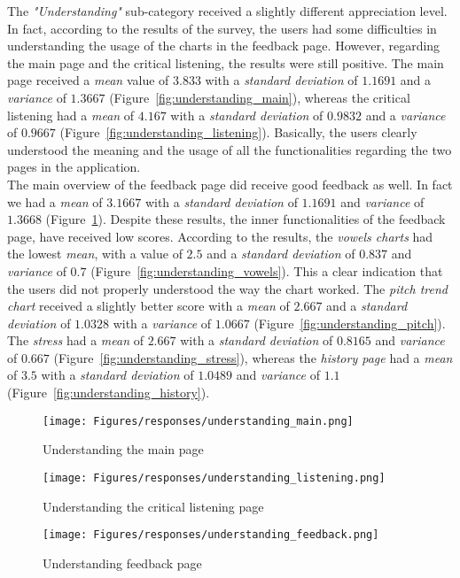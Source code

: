\noindent The \textit{"Understanding"} sub-category received a slightly different appreciation level. In fact, according to the results of the survey, the users had some difficulties in understanding the usage of the charts in the feedback page. However, regarding the main page and the critical listening, the results were still positive. The main page received a \textit{mean} value of $3.833$ with a \textit{standard deviation} of $1.1691$ and a \textit{variance} of $1.3667$ (Figure~\ref{fig:understanding_main}), whereas the critical listening had a \textit{mean} of $4.167$ with a \textit{standard deviation} of $0.9832$ and a \textit{variance} of $0.9667$ (Figure~\ref{fig:understanding_listening}). Basically, the users clearly understood the meaning and the usage of all the functionalities regarding the two pages in the application. \\
\noindent The main overview of the feedback page did receive good feedback as well. In fact we had a \textit{mean} of $3.1667$ with a \textit{standard deviation} of $1.1691$ and \textit{variance} of $1.3668$ (Figure~\ref{fig:understanding_feedback}). Despite these results, the inner functionalities of the feedback page, have received low scores. According to the results, the \textit{vowels charts} had the lowest \textit{mean}, with a value of $2.5$ and a \textit{standard deviation} of $0.837$ and \textit{variance} of $0.7$ (Figure~\ref{fig:understanding_vowels}). This a clear indication that the users did not properly understood the way the chart worked. The \textit{pitch trend chart} received a slightly better score with a \textit{mean} of $2.667$ and a \textit{standard deviation} of $1.0328$ with a \textit{variance} of $1.0667$ (Figure~\ref{fig:understanding_pitch}). \\
\noindent The \textit{stress} had a \textit{mean} of $2.667$ with a \textit{standard deviation} of $0.8165$ and \textit{variance} of $0.667$ (Figure~\ref{fig:understanding_stress}), whereas the \textit{history page} had a \textit{mean} of $3.5$ with a \textit{standard deviation} of $1.0489$ and \textit{variance} of $1.1$ (Figure~\ref{fig:understanding_history}).

\begin{figure}[!ht]
	\centering
	\begin{minipage}{.5\textwidth}
		\centering
		\texttt{[image: Figures/responses/understanding\_main.png]}
		\caption{Understanding the main page}
		\label{fig:understanding_main}
	\end{minipage}%
	\begin{minipage}{.5\textwidth}
		\centering
		\texttt{[image: Figures/responses/understanding\_listening.png]}
		\caption{Understanding the critical listening page}
		\label{fig:understanding_listening}
	\end{minipage}
	\begin{minipage}{.5\textwidth}
		\centering
		\texttt{[image: Figures/responses/understanding\_feedback.png]}
		\caption{Understanding feedback page}
		\label{fig:understanding_feedback}
	\end{minipage}%
\end{figure}

